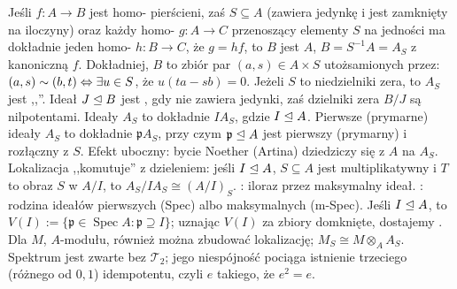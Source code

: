 Jeśli $f \colon A \to B$  jest homo- pierścieni, zaś $S \subseteq A$  (zawiera jedynkę i jest zamknięty na iloczyny) oraz każdy homo- $g \colon A \to C$ przenoszący elementy $S$ na jedności ma dokładnie jeden homo- $h \colon B \to C$, że $g = hf$, to $B$ jest  $A$, $B = S^{-1}A = A_S$ z kanoniczną $f$.
Dokładniej, $B$ to zbiór par $(a,s)\in A \times S$ utożsamionych przez: $(a, s) \sim (b, t) \Leftrightarrow \exists u \in S$, że $u(ta-sb) = 0$.
Jeżeli $S$ to niedzielniki zera, to $A_S$ jest ,,''.
Ideał $J \trianglelefteq B$ jest , gdy nie zawiera jedynki, zaś dzielniki zera $B/J$ są nilpotentami.
Ideały $A_S$ to dokładnie $IA_S$, gdzie $I \trianglelefteq A$.
Pierwsze (prymarne) ideały $A_S$ to dokładnie $\mathfrak p A_S$, przy czym $\mathfrak p \trianglelefteq A$ jest pierwszy (prymarny) i rozłączny z $S$.
Efekt uboczny: bycie Noether (Artina) dziedziczy się z $A$ na $A_S$.
Lokalizacja ,,komutuje'' z dzieleniem: jeśli $I \trianglelefteq A$, $S \subseteq A$ jest multiplikatywny i $T$ to obraz $S$ w $A/I$, to $A_S/IA_S \cong (A/I)_S$.
: iloraz przez maksymalny ideał.
: rodzina ideałów pierwszych (Spec) albo maksymalnych (m-Spec).
Jeśli $I \trianglelefteq A$, to $V(I) := \{\mathfrak p \in \operatorname{Spec} A : \mathfrak p \supseteq I\}$; uznając $V(I)$ za zbiory domknięte, dostajemy .
Dla $M$, $A$-modułu, również można zbudować lokalizację; $M_S \cong M \otimes_A A_S$.
Spektrum jest zwarte bez $\mathcal T_2$; jego niespójność pociąga istnienie trzeciego (różnego od $0, 1$) idempotentu, czyli $e$ takiego, że $e^2 = e$.
